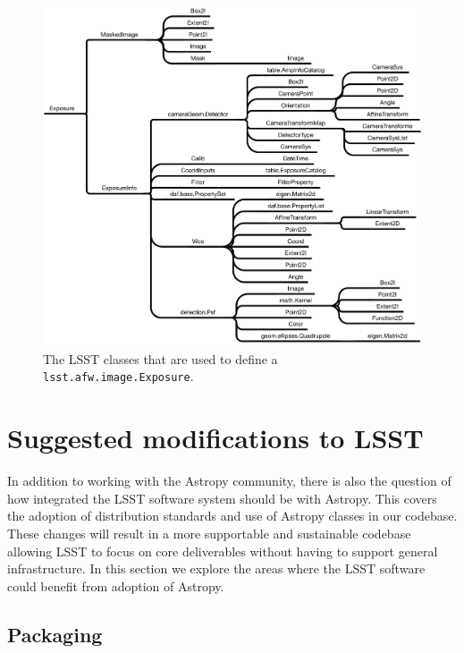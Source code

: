 \documentclass[]{spie}  %
\begin{document}
\begin{figure} [t]
\begin{center}
\includegraphics[width=\textwidth]{exposure-dependencies}
\end{center}
\caption[layers]
{\label{fig:exposure}
The LSST classes that are used to define a \texttt{lsst.afw.image.Exposure}.}
\end{figure}

\section{Suggested modifications to LSST}
\label{sec:lsstmods}

In addition to working with the Astropy community, there is also the question of how integrated the LSST software system should be with Astropy.
This covers the adoption of distribution standards and use of Astropy classes in our codebase.
These changes will result in a more supportable and sustainable codebase allowing LSST to focus on core deliverables without having to support general infrastructure.
In this section we explore the areas where the LSST software could benefit from adoption of Astropy.

\subsection{Packaging}
\end{document}
